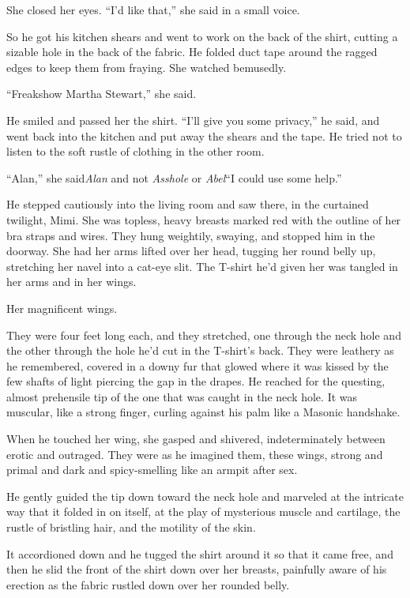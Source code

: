 She closed her eyes.  ``I'd like that,'' she said in a small voice.

So he got his kitchen shears and went to work on the back of the
shirt, cutting a sizable hole in the back of the fabric.  He folded
duct tape around the ragged edges to keep them from fraying.  She
watched bemusedly.

``Freakshow Martha Stewart,'' she said.

He smiled and passed her the shirt.  ``I'll give you some privacy,''
he said, and went back into the kitchen and put away the shears and
the tape.  He tried not to listen to the soft rustle of clothing in
the other room.

``Alan,'' she said\dash{}\textit{Alan} and not \textit{Asshole} or
\textit{Abel}\dash{}``I could use some help.''

He stepped cautiously into the living room and saw there, in the
curtained twilight, Mimi.  She was topless, heavy breasts marked red
with the outline of her bra straps and wires.  They hung weightily,
swaying, and stopped him in the doorway.  She had her arms lifted over
her head, tugging her round belly up, stretching her navel into a
cat-eye slit.  The T-shirt he'd given her was tangled in her arms and
in her wings.

Her magnificent wings.

They were four feet long each, and they stretched, one through the
neck hole and the other through the hole he'd cut in the T-shirt's
back.  They were leathery as he remembered, covered in a downy fur
that glowed where it was kissed by the few shafts of light piercing
the gap in the drapes.  He reached for the questing, almost prehensile
tip of the one that was caught in the neck hole.  It was muscular,
like a strong finger, curling against his palm like a Masonic
handshake.

When he touched her wing, she gasped and shivered, indeterminately
between erotic and outraged.  They were as he imagined them, these
wings, strong and primal and dark and spicy-smelling like an armpit
after sex.

He gently guided the tip down toward the neck hole and marveled at the
intricate way that it folded in on itself, at the play of mysterious
muscle and cartilage, the rustle of bristling hair, and the motility
of the skin.

It accordioned down and he tugged the shirt around it so that it came
free, and then he slid the front of the shirt down over her breasts,
painfully aware of his erection as the fabric rustled down over her
rounded belly.

